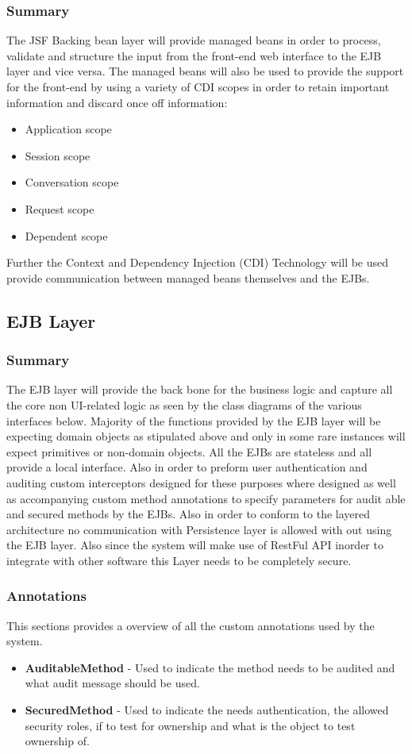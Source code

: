 \documentclass[12pt]{article}
\begin{document}
\subsubsection{Summary}
The JSF Backing bean layer will provide managed beans in order to process, validate and structure the input from the front-end web interface to the EJB layer and vice versa. The managed beans will also be used to provide the support for the front-end by using a variety of CDI scopes in order to retain important information and discard once off information:
\begin{itemize}
	\item Application scope
	\item Session scope
	\item Conversation scope
	\item Request scope
	\item Dependent scope
\end{itemize}
Further the Context and Dependency Injection (CDI) Technology will be used provide communication between managed beans themselves and the EJBs.

\newpage
\subsection{EJB Layer}
\subsubsection{Summary}
The EJB layer will provide the back bone for the business logic and capture all the core non UI-related logic as seen by the class diagrams of the various interfaces below. Majority of the functions provided by the EJB layer will be expecting domain objects as stipulated above and only in some rare instances will expect primitives or non-domain objects. All the EJBs are stateless and all provide a local interface. Also in order to preform user authentication and auditing custom interceptors designed for these purposes where designed as well as accompanying custom method annotations to specify parameters for audit able and secured methods by the EJBs. Also in order to conform to the layered architecture no communication with Persistence layer is allowed with out using the EJB layer. Also since the system will make use of RestFul API inorder to integrate with other software this Layer needs to be completely secure. 

\subsubsection{Annotations}
This sections provides a overview of all the custom annotations used by the system.
\begin{itemize}
	\item \textbf{AuditableMethod} - Used to indicate the method needs to be audited and what audit message should be used.
	\item \textbf{SecuredMethod} - Used to indicate the needs authentication, the allowed security roles, if to test for ownership and what is the object to test ownership of.
\end{itemize} 
\end{document}
